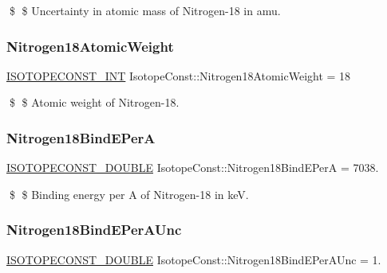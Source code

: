\$ \$ Uncertainty in atomic mass of Nitrogen-\/18 in amu. \mbox{\label{group___isotope_const-_nitrogen-_n18_ga26fe83428e6d1068cc67662c3a80ed95}} 
\subsubsection{\texorpdfstring{Nitrogen18\+Atomic\+Weight}{Nitrogen18AtomicWeight}}
{\footnotesize\ttfamily \mbox{\hyperlink{group___isotope_const-_macros_ga5f18360b3e99483a35c32d789e62621c}{I\+S\+O\+T\+O\+P\+E\+C\+O\+N\+S\+T\+\_\+\+I\+NT}} Isotope\+Const\+::\+Nitrogen18\+Atomic\+Weight = 18}

\$ \$ Atomic weight of Nitrogen-\/18. \mbox{\label{group___isotope_const-_nitrogen-_n18_ga0c62e56bd30dfb4dc0653e1ce7296f92}} 
\subsubsection{\texorpdfstring{Nitrogen18\+Bind\+E\+PerA}{Nitrogen18BindEPerA}}
{\footnotesize\ttfamily \mbox{\hyperlink{group___isotope_const-_macros_ga8f45a7272ce02c0b4c65c44636ed719a}{I\+S\+O\+T\+O\+P\+E\+C\+O\+N\+S\+T\+\_\+\+D\+O\+U\+B\+LE}} Isotope\+Const\+::\+Nitrogen18\+Bind\+E\+PerA = 7038.}

\$ \$ Binding energy per A of Nitrogen-\/18 in keV. \mbox{\label{group___isotope_const-_nitrogen-_n18_ga030572fd6d6e6543028c643bc1f94dd3}} 
\subsubsection{\texorpdfstring{Nitrogen18\+Bind\+E\+Per\+A\+Unc}{Nitrogen18BindEPerAUnc}}
{\footnotesize\ttfamily \mbox{\hyperlink{group___isotope_const-_macros_ga8f45a7272ce02c0b4c65c44636ed719a}{I\+S\+O\+T\+O\+P\+E\+C\+O\+N\+S\+T\+\_\+\+D\+O\+U\+B\+LE}} Isotope\+Const\+::\+Nitrogen18\+Bind\+E\+Per\+A\+Unc = 1.}

